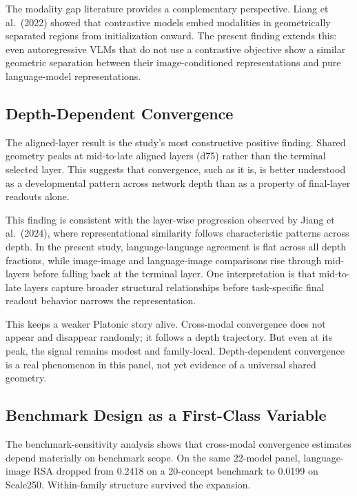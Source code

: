 \documentclass[11pt,a4paper]{article}
\begin{document}
The modality gap literature provides a complementary perspective. Liang
et al.~(2022) showed that contrastive models embed modalities in
geometrically separated regions from initialization onward. The present
finding extends this: even autoregressive VLMs that do not use a
contrastive objective show a similar geometric separation between their
image-conditioned representations and pure language-model
representations.

\subsection{Depth-Dependent
Convergence}\label{depth-dependent-convergence}

The aligned-layer result is the study's most constructive positive
finding. Shared geometry peaks at mid-to-late aligned layers (d75)
rather than the terminal selected layer. This suggests that convergence,
such as it is, is better understood as a developmental pattern across
network depth than as a property of final-layer readouts alone.

This finding is consistent with the layer-wise progression observed by
Jiang et al.~(2024), where representational similarity follows
characteristic patterns across depth. In the present study,
language-language agreement is flat across all depth fractions, while
image-image and language-image comparisons rise through mid-layers
before falling back at the terminal layer. One interpretation is that
mid-to-late layers capture broader structural relationships before
task-specific final readout behavior narrows the representation.

This keeps a weaker Platonic story alive. Cross-modal convergence does
not appear and disappear randomly; it follows a depth trajectory. But
even at its peak, the signal remains modest and family-local.
Depth-dependent convergence is a real phenomenon in this panel, not yet
evidence of a universal shared geometry.

\subsection{Benchmark Design as a First-Class
Variable}\label{benchmark-design-as-a-first-class-variable}

The benchmark-sensitivity analysis shows that cross-modal convergence
estimates depend materially on benchmark scope. On the same 22-model
panel, language-image RSA dropped from 0.2418 on a 20-concept benchmark
to 0.0199 on Scale250. Within-family structure survived the expansion.
\end{document}
